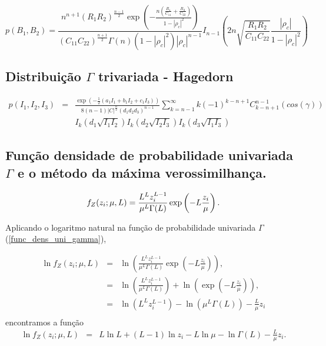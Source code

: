 \documentclass[journal,article,submit,moreauthors,pdftex]{Definitions/mdpi}
\begin{document}
\begin{equation}\label{eqn62}
	p(B_1,B_2)=\frac{n^{n+1}\left(R_1R_2\right)^{\frac{n-1}{2}}\exp\left(-\frac{n(\frac{R_1}{C_{11}}+\frac{R_2}{C_{22}})}{1-|\rho_c|^2}\right)}{(C_{11}C_{22})^{\frac{n+1}{2}}\Gamma(n)(1-|\rho_c|^2)|\rho_c|^{n-1}}I_{n-1}\left(2n\sqrt{\frac{R_1R_2}{C_{11}C_{22}}}\frac{|\rho_c|}{1-|\rho_c|^2}\right)
\end{equation}
\subsection{Distribuição $\Gamma$ trivariada - Hagedorn }
\begin{equation}\label{eqn62}
\begin{array}{ccc}
	p(I_1,I_2,I_3)&=& \frac{\exp(-\frac{1}{2}(a_1I_1+b_1I_2+c_1I_3))}{8(n-1)|C|^{\frac{n}{2}}(d_1d_2d_3)^{n-1}}\sum_{k=n-1}^{\infty}k(-1)^{k-n+1}C_{k-n+1}^{n-1}(cos(\gamma))\\
	&&I_k(d_1\sqrt{I_1I_2})I_k(d_2\sqrt{I_2I_3})I_k(d_3\sqrt{I_1I_3})
\end{array}
\end{equation}
\subsection{Função densidade de probabilidade univariada $\Gamma$ e o método da máxima verossimilhança.}
\begin{equation}\label{func_dens_uni_gamma}
	f_{Z}(z_{i};\mu,L)=\frac{L^{L}z_{i}^{L-1}}{\mu^{L}\Gamma(L)} \exp\left(-L\frac{z_{i}}{\mu}\right). \\
\end{equation}

Aplicando o logaritmo natural na função de probabilidade univariada $\Gamma$ (\ref{func_dens_uni_gamma}),

\begin{equation}\nonumber
\begin{array}{ccc}
	\ln f_{Z}(z_{i};\mu,L)&=&\ln \left(\frac{L^{L}z_{i}^{L-1}}{\mu^{L}\Gamma(L)} \exp\left(-L\frac{z_{i}}{\mu}\right)\right), \\
	                                         &=&\ln \left(\frac{L^{L}z_{i}^{L-1}}{\mu^{L}\Gamma(L)}\right) + \ln\left(\exp\left(-L\frac{z_{i}}{\mu}\right)\right), \\
	                                         &=&\ln \left(L^{L}z_{i}^{L-1} \right)-\ln\left(\mu^{L}\Gamma(L)\right) -\frac{L}{\mu} z_i\\
\end{array}
\end{equation}
encontramos a função
\begin{equation}\label{func_max_ver_uni_gamma}
\begin{array}{ccc}
	\ln f_{Z}(z_{i};\mu,L)&=& L\ln L +(L - 1) \ln z_{i}-L \ln \mu-\ln \Gamma(L) -\frac{L}{\mu} z_i.\\
\end{array}
\end{equation}
\end{document}
